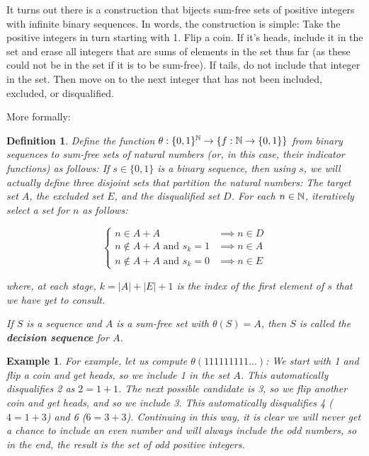 \documentclass{report}
\newtheorem{definition}[theorem]{Definition}
\newtheorem{example}{Example}
\theoremstyle{remark}
\numberwithin{equation}{section}
\begin{document}
It turns out there is a construction that bijects sum-free sets of
positive integers with infinite binary sequences.  In words, the
construction is simple: Take the positive integers in turn starting
with 1.  Flip a coin.  If it's heads, include it in the set and erase
all integers that are sums of elements in the set thus far (as these
could not be in the set if it is to be sum-free).  If tails, do not
include that integer in the set.  Then move on to the next integer
that has not been included, excluded, or disqualified.

More formally: 

\begin{definition}Define the function
  $\theta : \{0,1\}^{\mathbb{N}} \to \{f : \mathbb{N} \to \{0,1\}\}$ from binary
  sequences to sum-free sets of natural numbers (or, in this case,
  their indicator functions) as follows: If $s\in\{0,1\}$ is a binary
  sequence, then using $s$, we will actually define three disjoint
  sets that partition the natural numbers: The target set $A$, the
  excluded set $E$, and the disqualified set $D$.  For each
  $n \in \mathbb{N}$, iteratively select a set for $n$ as follows:

\[\begin{cases}
n \in A+A &\implies n \in D\\
n \notin A+A \text{ and } s_k = 1 &\implies n \in A\\
n \notin A+A \text{ and } s_k = 0 &\implies n \in E
\end{cases}\]

where, at each stage, $k = |A|+|E|+1$ is the index of the first
element of $s$ that we have yet to consult. 

If $S$ is a sequence and $A$ is a sum-free set with $\theta(S) = A$,
then $S$ is called the \textbf{decision sequence} for $A$.
\end{definition}

\begin{example}
  For example, let us compute $\theta(111111111...)$: We start with 1
  and flip a coin and get heads, so we include 1 in the set $A$.  This
  automatically disqualifies 2 as $2 = 1+1$.  The next possible
  candidate is 3, so we flip another coin and get heads, and so we
  include 3.  This automatically disqualifies 4 ($4 = 1+3$) and 6
  ($6 = 3+3$).  Continuing in this way, it is clear we will never get
  a chance to include an even number and will always include the odd
  numbers, so in the end, the result is the set of odd positive
  integers.
\end{example}
\end{document}
